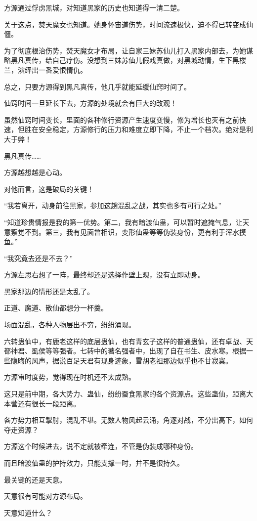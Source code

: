 \begin{this_body}
方源通过俘虏黑城，对知道黑家的历史也知道得一清二楚。

关于这点，焚天魔女也知道。她身怀宙道伤势，时间流速极快，迫不得已转变成仙僵。

为了彻底根治伤势，焚天魔女才布局，让自家三妹苏仙儿打入黑家内部去，为她谋略黑凡真传，给自己疗伤。没想到三妹苏仙儿假戏真做，对黑城动情，生下黑楼兰，演绎出一番爱恨情仇。

总之，只要方源得到黑凡真传，他几乎就能延缓仙窍时间了。

仙窍时间一旦延长下去，方源的处境就会有巨大的改观！

虽然仙窍时间变长，里面的各种修行资源产生速度变慢，修为增长也灭有之前快速，但胜在安全稳定，方源修行的压力和难度立即下降，不止一个档次。绝对是利大于弊！

黑凡真传……

方源越想越是心动。

对他而言，这是破局的关键！

“我若离开，动身前往黑家，参加这趟混乱之战，其实也多有可行之处。”

“知道珍贵情报是我的第一优势。第二，我有暗渡仙蛊，可以暂时遮掩气息，让天意察觉不到。第三，我有见面曾相识，变形仙蛊等等伪装身份，更有利于浑水摸鱼。”

“我究竟去还是不去？”

方源左思右想了一阵，最终却还是选择作壁上观，没有立即动身。

黑家那边的情形还是太乱了。

正道、魔道、散仙都想分一杯羹。

场面混乱，各种人物层出不穷，纷纷涌现。

六转蛊仙中，有鹿老这样的底层蛊仙，也有青玄子这样的普通蛊仙，还有卓战、天都神君、虱侯等等强者。七转中的著名强者中，出现了自在书生、皮水寒。根据一些隐晦的风声，据说百足天君有现身迹象，雪胡老祖那边似乎也不甘寂寞。

方源审时度势，觉得现在时机还不太成熟。

这只是前中期，各大势力、蛊仙，纷纷蚕食黑家的各个资源点。这些蛊仙，距离大本营还有很长一段距离。

各方势力相互掣肘，混乱不堪。无数人物风起云涌，角逐对战，不分出高下，如何夺走资源？

方源这个时候进去，说不定就被牵连，不管是伪装成哪种身份。

而且暗渡仙蛊的护持效力，只能支撑一时，并不是很持久。

最关键的还是天意。

天意很有可能对方源布局。

天意知道什么？


\end{this_body}
